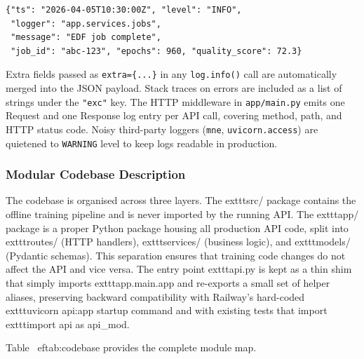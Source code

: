 \documentclass[10pt]{article}
\begin{document}
\begin{verbatim}
{"ts": "2026-04-05T10:30:00Z", "level": "INFO",
 "logger": "app.services.jobs",
 "message": "EDF job complete",
 "job_id": "abc-123", "epochs": 960, "quality_score": 72.3}
\end{verbatim}

Extra fields passed as \texttt{extra=\{...\}} in any \texttt{log.info()} call are automatically merged into the JSON payload. Stack traces on errors are included as a list of strings under the \texttt{"exc"} key. The HTTP middleware in \texttt{app/main.py} emits one Request and one Response log entry per API call, covering method, path, and HTTP status code. Noisy third-party loggers (\texttt{mne}, \texttt{uvicorn.access}) are quietened to \texttt{WARNING} level to keep logs readable in production.

\subsubsection{Modular Codebase Description}
\label{sec:codebaseDescription}

The codebase is organised across three layers. The 	exttt{src/} package contains the offline training pipeline and is never imported by the running API. The 	exttt{app/} package is a proper Python package housing all production API code, split into 	exttt{routes/} (HTTP handlers), 	exttt{services/} (business logic), and 	exttt{models/} (Pydantic schemas). This separation ensures that training code changes do not affect the API and vice versa. The entry point 	exttt{api.py} is kept as a thin shim that simply imports 	exttt{app.main.app} and re-exports a small set of helper aliases, preserving backward compatibility with Railway's hard-coded 	exttt{uvicorn api:app} startup command and with existing tests that import 	exttt{import api as api\_mod}.

Table~
ef{tab:codebase} provides the complete module map.
\end{document}

